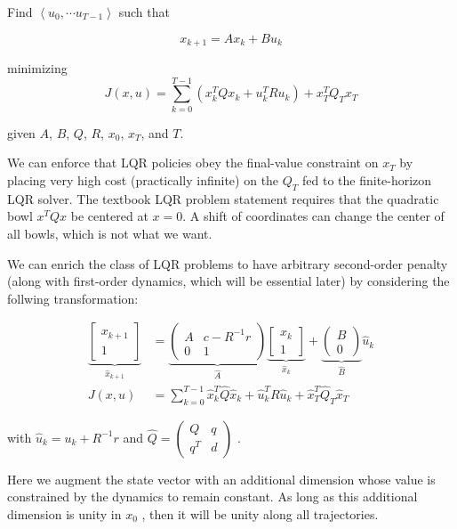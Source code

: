 \documentclass[letterpaper, 10pt, english, conference]{IEEEtran}
\begin{document}
Find $\left\langle u_{0},\cdots u_{T-1}\right\rangle $ such that 

\[
x_{k+1}=Ax_{k}+Bu_{k}
\]


minimizing 
\[
J\left(x,u\right)=\sum_{k=0}^{T-1}\left(x_{k}^{T}Qx_{k}+u_{k}^{T}Ru_{k}\right)+x_{T}^{T}Q_{T}x_{T}
\]


given $A$, $B$, $Q$, $R$, $x_{0}$, $x_{T}$, and $T$.

We can enforce that LQR policies obey the final-value constraint on
$x_{T}$ by placing very high cost (practically infinite) on the $Q_{T}$
fed to the finite-horizon LQR solver. The textbook LQR problem statement
requires that the quadratic bowl $x^{T}Qx$ be centered at $x=0$.
A shift of coordinates can change the center of all bowls, which is
not what we want.

We can enrich the class of LQR problems to have arbitrary second-order
penalty (along with first-order dynamics, which will be essential
later) by considering the follwing transformation:

\begin{align*}
\underbrace{\left[\begin{matrix}x_{k+1}\\
1
\end{matrix}\right]}_{\hat{x}_{k+1}} & =\underbrace{\left(\begin{matrix}A & c-R^{-1}r\\
0 & 1
\end{matrix}\right)}_{\hat{A}}\underbrace{\left[\begin{matrix}x_{k}\\
1
\end{matrix}\right]}_{\hat{x}_{k}}+\underbrace{\left(\begin{matrix}B\\
0
\end{matrix}\right)}_{\hat{B}}\hat{u}_{k}\\
J\left(x,u\right) & =\sum_{k=0}^{T-1}\hat{x}_{k}^{T}\hat{Q}\hat{x}_{k}+\hat{u}_{k}^{T}R\hat{u}_{k}+\hat{x}_{T}^{T}\hat{Q}_{T}\hat{x}_{T}
\end{align*}


with $\hat{u}_{k}=u_{k}+R^{-1}r$ and $\hat{Q}=\left(\begin{matrix}Q & q\\
q^{T} & d
\end{matrix}\right)$ . 

Here we augment the state vector with an additional dimension whose
value is constrained by the dynamics to remain constant. As long as
this additional dimension is unity in $x_{0}$ , then it will be unity
along all trajectories.
\end{document}
